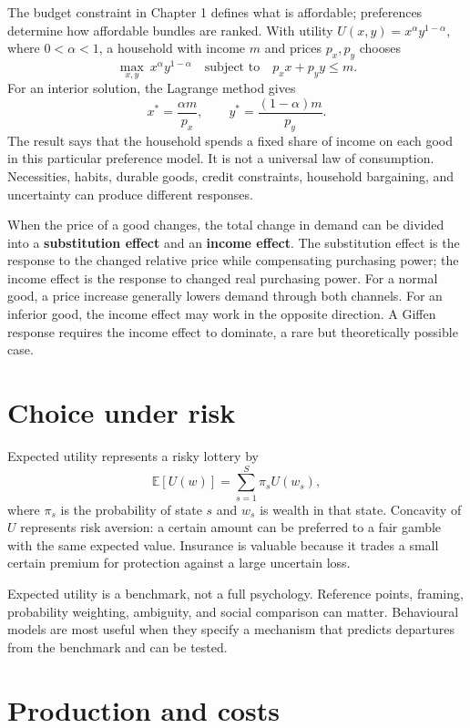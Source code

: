 \documentclass[11pt,oneside,openany]{book}
\newcommand{\term}[1]{\textbf{#1}\index{#1}}
\newcommand{\E}{\mathbb{E}}
\begin{document}
The budget constraint in Chapter 1 defines what is affordable; preferences determine how affordable bundles are ranked. With utility $U(x,y)=x^\alpha y^{1-\alpha}$, where $0<\alpha<1$, a household with income $m$ and prices $p_x,p_y$ chooses
\[
  \max_{x,y}\ x^\alpha y^{1-\alpha}\quad\text{subject to}\quad p_xx+p_yy\leq m.
\]
For an interior solution, the Lagrange method gives
\[
  x^*=\frac{\alpha m}{p_x},\qquad y^*=\frac{(1-\alpha)m}{p_y}.
\]
The result says that the household spends a fixed share of income on each good in this particular preference model. It is not a universal law of consumption. Necessities, habits, durable goods, credit constraints, household bargaining, and uncertainty can produce different responses.

When the price of a good changes, the total change in demand can be divided into a \term{substitution effect} and an \term{income effect}. The substitution effect is the response to the changed relative price while compensating purchasing power; the income effect is the response to changed real purchasing power. For a normal good, a price increase generally lowers demand through both channels. For an inferior good, the income effect may work in the opposite direction. A Giffen response requires the income effect to dominate, a rare but theoretically possible case.

\section{Choice under risk}

Expected utility represents a risky lottery by
\[
  \E[U(w)]=\sum_{s=1}^{S}\pi_s U(w_s),
\]
where $\pi_s$ is the probability of state $s$ and $w_s$ is wealth in that state. Concavity of $U$ represents risk aversion: a certain amount can be preferred to a fair gamble with the same expected value. Insurance is valuable because it trades a small certain premium for protection against a large uncertain loss.

Expected utility is a benchmark, not a full psychology. Reference points, framing, probability weighting, ambiguity, and social comparison can matter. Behavioural models are most useful when they specify a mechanism that predicts departures from the benchmark and can be tested.

\section{Production and costs}
\end{document}
